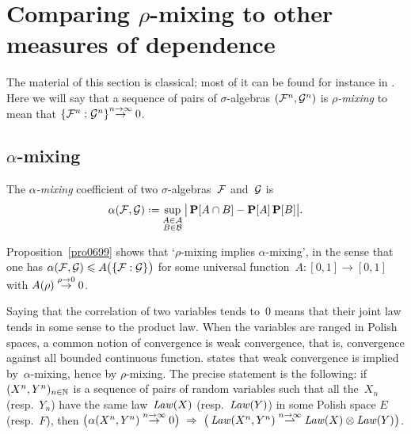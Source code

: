 \section{Comparing \texorpdfstring{$\rho$}{rho}-mixing to other measures of dependence}

The material of this section is classical; most of it can be found for instance in
\cite[\S\S~3~\&~5]{Bradley-book}.
Here we will say that a sequence of pairs of $\sigma$-algebras $(\mathcal{F}^n,\mathcal{G}^n)$
is \emph{$\rho$-mixing} to mean that ${\{ \mathcal{F}^n : \mathcal{G}^n \}} \allowbreak {\stackrel{n\to\infty}{\to} 0}$.

\subsection{\texorpdfstring{$\alpha$}{alpha}-mixing}\label{parAlphaMixing}

\begin{Def}
The \emph{$\alpha$-mixing} coefficient of two $\sigma$-algebras~$\mathcal{F}$ and~$\mathcal{G}$ is
\[ \alpha(\mcal{F},\mcal{G}) \coloneqq
\sup_{\substack{A\in\mcal{A}\\B\in\mcal{B}}} \big| \Pr[A\cap B] - \Pr[A]\Pr[B] \big| .\]
\end{Def}

Proposition~\ref{pro0699} shows that `$\rho$-mixing implies $\alpha$-mixing',
in the sense that one has $\alpha(\mcal{F},\mcal{G}) \leq A\big(\{\mcal{F}:\mcal{G}\}\big)$
for some universal function~$A \colon [0,1] \to [0,1]$
with $A(\rho) \stackrel{\rho\to0}{\to} 0$.

\begin{Rmk}
Saying that the correlation of two variables tends to~$0$ means that
their joint law tends in some sense to the product law.
When the variables are ranged in Polish spaces,
a common notion of convergence is weak convergence,
that is, convergence against all bounded continuous function.
%
\cite[Theorem~2.2]{Billingsley} states that weak convergence is implied
by~$\alpha$-mixing, hence by $\rho$-mixing.
The precise statement is the following:
if $(X^n,Y^n)_{n\in\mathbb{N}}$ is a sequence of pairs of random variables
such that all the~$X_n$ (resp.~$Y_n$)
have the same law~$\operatorname{\mathit{Law}}(X)$ (resp.~$\operatorname{\mathit{Law}}(Y)$) in some Polish space $E$ (resp.~$F$), then
$\big(\alpha(X^n,Y^n) \stackrel{n\longto\infty}{\longto} 0\big) \ \Rightarrow
\ \big(\Law(X^n,Y^n)\stackrel{n\longto\infty}{\rightharpoonup}\Law(X)\otimes\Law(Y)\big)$.
\end{Rmk}

